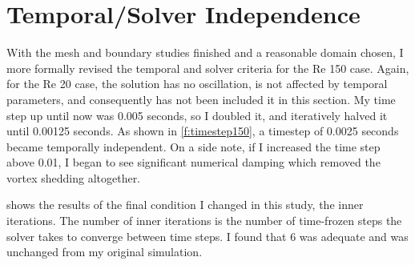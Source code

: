 \documentclass[10pt,english]{article}
\begin{document}
\section{Temporal/Solver Independence}

With the mesh and boundary studies finished and a reasonable domain chosen, I more formally revised the temporal and solver criteria for the Re 150 case.  Again, for the Re 20 case, the solution has no oscillation, is not affected by temporal parameters, and consequently has not been included it in this section.  My time step up until now was 0.005 seconds, so I doubled it, and iteratively halved it until 0.00125 seconds.  As shown in \cref{f:timestep150}, a timestep of 0.0025 seconds became temporally independent.  On a side note, if I increased the time step above 0.01, I began to see significant numerical damping which removed the vortex shedding altogether.  

 shows the results of the final condition I changed in this study, the inner iterations.  The number of inner iterations is the number of time-frozen steps the solver takes to converge between time steps.  I found that 6 was adequate and was unchanged from my original simulation.  
\end{document}
